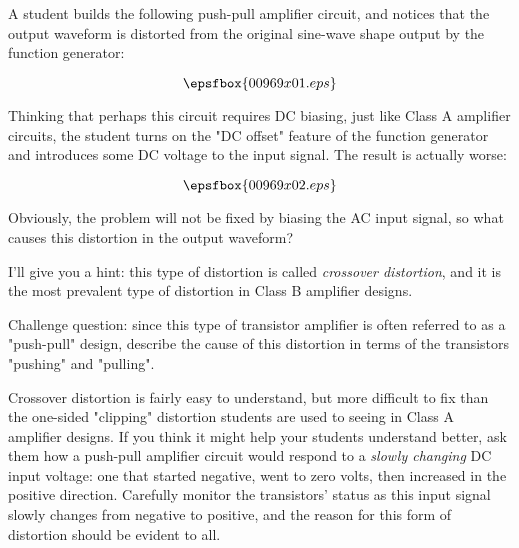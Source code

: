 

A student builds the following push-pull amplifier circuit, and notices that the output waveform is distorted from the original sine-wave shape output by the function generator:

$$\epsfbox{00969x01.eps}$$

Thinking that perhaps this circuit requires DC biasing, just like Class A amplifier circuits, the student turns on the "DC offset" feature of the function generator and introduces some DC voltage to the input signal.  The result is actually worse:

$$\epsfbox{00969x02.eps}$$

Obviously, the problem will not be fixed by biasing the AC input signal, so what causes this distortion in the output waveform?







I'll give you a hint: this type of distortion is called {\it crossover distortion}, and it is the most prevalent type of distortion in Class B amplifier designs.

\vskip 10pt

Challenge question: since this type of transistor amplifier is often referred to as a "push-pull" design, describe the cause of this distortion in terms of the transistors "pushing" and "pulling".







Crossover distortion is fairly easy to understand, but more difficult to fix than the one-sided "clipping" distortion students are used to seeing in Class A amplifier designs.  If you think it might help your students understand better, ask them how a push-pull amplifier circuit would respond to a {\it slowly changing} DC input voltage: one that started negative, went to zero volts, then increased in the positive direction.  Carefully monitor the transistors' status as this input signal slowly changes from negative to positive, and the reason for this form of distortion should be evident to all.




